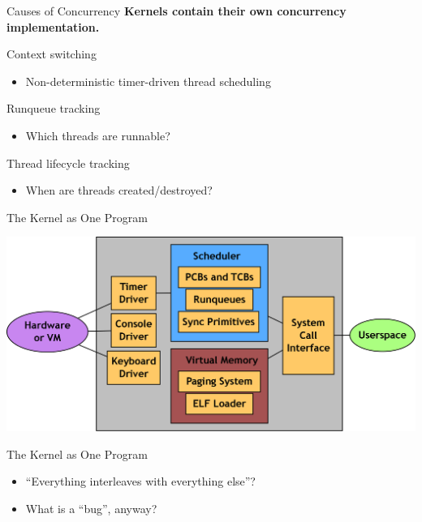 \documentclass[xcolor=dvipsnames]{beamer}
\begin{document}
\begin{frame}{Causes of Concurrency} %
	\textbf{Kernels contain their own concurrency implementation.}

	\linegap
	Context switching
	\begin{itemize}
		\item Non-deterministic timer-driven thread scheduling
	\end{itemize}
	Runqueue tracking
	\begin{itemize}
		\item Which threads are runnable?
	\end{itemize}
	Thread lifecycle tracking
	\begin{itemize}
		\item When are threads created/destroyed?
	\end{itemize}
\end{frame}

%	
%	

\begin{frame}{The Kernel as One Program} %
	\begin{center}
	\includegraphics[width=\textwidth]{pebbles.png}
	\end{center}
\end{frame}
\begin{frame}{The Kernel as One Program} %
	\begin{itemize}
		\item ``Everything interleaves with everything else''?
		\item What is a ``bug'', anyway?
	\end{itemize}
\end{frame}
\end{document}
